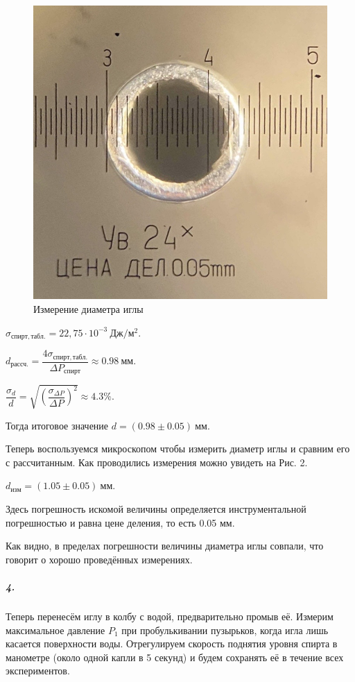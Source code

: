 \documentclass[a4paper,12pt]{article}
\begin{document}
   	\begin{figure} 
	\centering 
	\includegraphics[scale=0.14]{контент.jpg} 
	\caption{Измерение диаметра иглы} 
\end{figure}

$
\sigma_{спирт, табл.} = 22,75 \cdot 10^{-3} ~  Дж /  м^2.
$


$
d_{рассч.}= \dfrac{4\sigma_{спирт, табл.}}{\Delta P_{спирт}}\approx 0.98~мм.
$

$
\dfrac{\sigma_d}{d}=\sqrt{\left(\dfrac{\sigma_{\Delta P}}{\Delta P}\right)^2}\approx 4.3\%.
$

Тогда итоговое значение 
$
d = (0.98 \pm 0.05)~ мм.
$

 Теперь воспользуемся микроскопом чтобы измерить диаметр иглы и сравним его с рассчитанным. Как проводились измерения можно увидеть на Рис. 2.
 
$
d_{изм} = (1.05 \pm 0.05)~ мм.
$

Здесь погрешность искомой величины определяется инструментальной погрешностью и равна цене деления, то есть 0.05 мм. 

Как видно, в пределах погрешности величины диаметра иглы совпали, что говорит о хорошо проведённых измерениях. 


\subparagraph{4.} Теперь перенесём иглу в колбу с водой, предварительно промыв её. Измерим максимальное давление $P_1$ при пробулькивании пузырьков, когда игла лишь касается поверхности воды. Отрегулируем скорость поднятия уровня спирта в манометре (около одной капли в 5 секунд) и будем сохранять её в течение всех экспериментов. 
\end{document}
